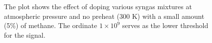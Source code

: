 \begin{figure}

\centering



\caption[Syngas-alkane-air flame results - I]{The plot shows the effect of doping various syngas mixtures at atmospheric pressure and no preheat (300 K) with a small amount (5\%) of methane. The ordinate \(1\times10^9\) serves as the lower threshold for the signal.}

\label{fig:syngas-300}

\end{figure}

